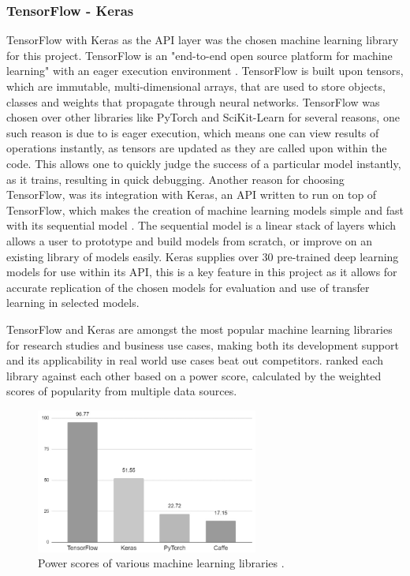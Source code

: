 \subsubsection{TensorFlow - Keras}
TensorFlow with Keras as the API layer was the chosen machine learning library for this project. TensorFlow is an "end-to-end open source platform for machine learning" with an eager execution environment \citep{TensorFl5:online}. TensorFlow is built upon tensors, which are immutable, multi-dimensional arrays, that are used to store objects, classes and weights that propagate through neural networks. TensorFlow was chosen over other libraries like PyTorch and SciKit-Learn for several reasons, one such reason is due to is eager execution, which means one can view results of operations instantly, as tensors are updated as they are called upon within the code. This allows one to quickly judge the success of a particular model instantly, as it trains, resulting in quick debugging. Another reason for choosing TensorFlow, was its integration with Keras, an API written to run on top of TensorFlow, which makes the creation of machine learning models simple and fast with its sequential model \citep{AboutKer65:online}. The sequential model is a linear stack of layers which allows a user to prototype and build models from scratch, or improve on an existing library of models easily. Keras supplies over 30 pre-trained deep learning models for use within its API, this is a key feature in this project as it allows for accurate replication of the chosen models for evaluation and use of transfer learning in selected models.

TensorFlow and Keras are amongst the most popular machine learning libraries for research studies and business use cases, making both its development support and its applicability in real world use cases beat out competitors. \cite{hale2018deep} ranked each library against each other based on a power score, calculated by the weighted scores of popularity from multiple data sources. 

\begin{figure}[H]
    \centering
    \includegraphics[width=0.65\textwidth]{figures/ml-power-sources.jpg}
    \caption{Power scores of various machine learning libraries \citep{hale2018deep}.}
    \label{fig:ml-power-scores}
\end{figure}

